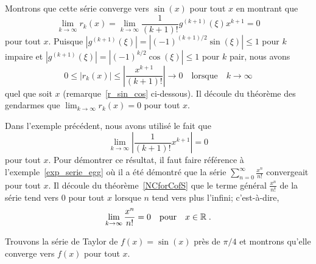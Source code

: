 {\begin{egg}
Montrons que cette série converge vers $\sin(x)$ pour tout $x$ en
montrant que
\[
\lim_{k\rightarrow \infty} r_k(x) =
\lim_{k\rightarrow \infty}
\frac{1}{(k+1)!} g^{(k+1)}(\xi) x^{k+1} = 0
\]
pour tout $x$.  Puisque $\displaystyle \left| g^{(k+1)}(\xi) \right|
= \left| (-1)^{(k+1)/2} \sin(\xi) \right| \leq 1$ pour $k$ impaire et
$\displaystyle \left| g^{(k+1)}(\xi) \right|
= \left| (-1)^{k/2} \cos(\xi) \right| \leq 1$ pour $k$ pair, nous avons
\[
0 \leq \left| r_k(x) \right| \leq \left| \frac{x^{k+1}}{(k+1)!} \right|
\rightarrow 0 \quad \text{lorsque} \quad k \rightarrow \infty
\]
quel que soit $x$ (remarque~\ref{r_sin_cos} ci-dessous).  Il
découle du théorème des gendarmes que
$\displaystyle \lim_{k\rightarrow \infty} r_k(x) = 0$ pour tout $x$.
\label{sin_cos_series}
\end{egg}

\begin{rmk}
Dans l'exemple précédent, nous avons utilisé le fait que
\[
\lim_{k\rightarrow \infty}
\left| \frac{1}{(k+1)!} x^{k+1}\right| = 0
\]
pour tout $x$.  Pour démontrer ce résultat, il faut faire référence
à l'exemple~\ref{exp_serie_egg} où il a été démontré que la série
$\displaystyle \sum_{n=0}^\infty \frac{x^n}{n!}$ convergeait pour
tout $x$.  Il découle du théorème~\ref{NCforCofS} que le terme général
$\displaystyle \frac{x^n}{n!}$ de la série tend vers $0$ pour tout $x$
lorsque $n$ tend vers plus l'infini; c'est-à-dire,
\[
\lim_{k\rightarrow \infty} \frac{x^n}{n!} = 0 \quad \text{pour} \quad x\in\mathbb{R} \; .
\]
\label{r_sin_cos}
\end{rmk}

\begin{egg}
Trouvons la série de Taylor de $f(x)=\sin(x)$ près de $\pi/4$ et
montrons qu'elle converge vers $f(x)$ pour tout $x$.


\end{egg}}
